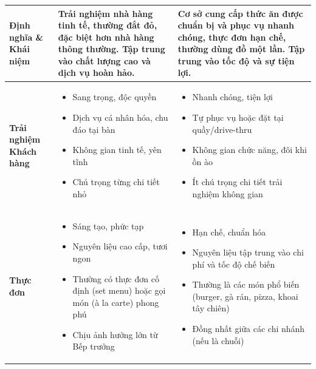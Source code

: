 \begin{longtable}{| m{3.5cm} | >{\RaggedRight}m{6.5cm} | >{\RaggedRight}m{6.5cm} |}
	\hline
	\endlastfoot

	\textbf{Định nghĩa \& Khái niệm}     & Trải nghiệm nhà hàng tinh tế, thường đắt đỏ, đặc biệt hơn nhà hàng thông thường. Tập trung vào chất lượng cao và dịch vụ hoàn hảo.                                                                                                                                                      & Cơ sở cung cấp thức ăn được chuẩn bị và phục vụ nhanh chóng, thực đơn hạn chế, thường dùng đồ một lần. Tập trung vào tốc độ và sự tiện lợi.                                                                                                                                     \\
	\hline
	\textbf{Trải nghiệm Khách hàng}      & \begin{itemize} \item Sang trọng, độc quyền \item Dịch vụ cá nhân hóa, chu đáo tại bàn \item Không gian tinh tế, yên tĩnh \item Chú trọng từng chi tiết nhỏ \end{itemize}                                                                                                               & \begin{itemize} \item Nhanh chóng, tiện lợi \item Tự phục vụ hoặc đặt tại quầy/drive-thru \item Không gian chức năng, đôi khi ồn ào \item Ít chú trọng chi tiết trải nghiệm không gian \end{itemize}                                                                            \\
	\hline
	\textbf{Thực đơn}                    & \begin{itemize} \item Sáng tạo, phức tạp \item Nguyên liệu cao cấp, tươi ngon \item Thường có thực đơn cố định (set menu) hoặc gọi món (à la carte) phong phú \item Chịu ảnh hưởng lớn từ Bếp trưởng \end{itemize}                                                                      & \begin{itemize} \item Hạn chế, chuẩn hóa \item Nguyên liệu tập trung vào chi phí và tốc độ chế biến \item Thường là các món phổ biến (burger, gà rán, pizza, khoai tây chiên) \item Đồng nhất giữa các chi nhánh (nếu là chuỗi) \end{itemize}                                   \\

\end{longtable}

